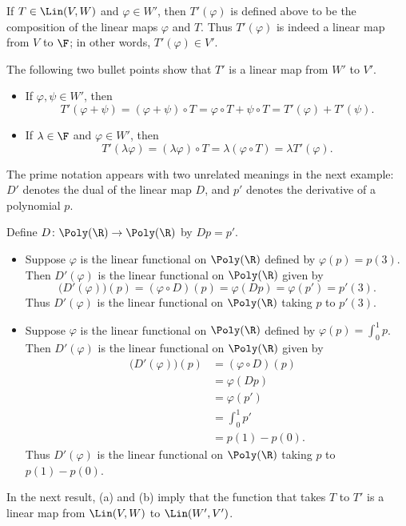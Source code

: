If $T\in\Lin(V,W)$ and $\varphi\in W'$, then $T'(\varphi)$ is defined above to be
the composition of the linear maps $\varphi$ and $T$. Thus $T'(\varphi)$ is
indeed a linear map from $V$ to $\F$; in other words, $T'(\varphi)\in V'$.

The following two bullet points show that $T'$ is a linear map from $W'$ to
$V'$.
\begin{itemize}
\item If $\varphi,\psi\in W'$, then
  \[ T'(\varphi+\psi) = (\varphi+\psi)\circ T = \varphi\circ T+\psi\circ T
     = T'(\varphi)+T'(\psi). \]
\item If $\lambda\in\F$ and $\varphi\in W'$, then
  \[ T'(\lambda\varphi) = (\lambda\varphi)\circ T = \lambda(\varphi\circ T)
     = \lambda T'(\varphi). \]
\end{itemize}

The prime notation appears with two unrelated meanings in the next example: $D'$
denotes the dual of the linear map $D$, and $p'$ denotes the derivative of a
polynomial $p$.

\begin{example}\label{ax:3.119}
Define $D\colon\Poly(\R)\to\Poly(\R)$ by $Dp=p'$.
\begin{itemize}
\item Suppose $\varphi$ is the linear functional on $\Poly(\R)$ defined by
  $\varphi(p)=p(3)$. Then $D'(\varphi)$ is the linear functional on $\Poly(\R)$
  given by
  \[ \bigl(D'(\varphi)\bigr)(p) = (\varphi\circ D)(p) = \varphi(Dp)
     = \varphi(p') = p'(3). \]
  Thus $D'(\varphi)$ is the linear functional on $\Poly(\R)$ taking $p$ to
  $p'(3)$.
\item Suppose $\varphi$ is the linear functional on $\Poly(\R)$ defined by
  $\varphi(p)=\int_0^1p$. Then $D'(\varphi)$ is the linear functional on
  $\Poly(\R)$ given by
  \begin{align*}
  \bigl(D'(\varphi)\bigr)(p) &= (\varphi\circ D)(p)\\
    &= \varphi(Dp)\\
    &= \varphi(p')\\
    &= \int_0^1 p'\\
    &= p(1)-p(0).
  \end{align*}
  Thus $D'(\varphi)$ is the linear functional on $\Poly(\R)$ taking $p$ to
  $p(1)-p(0)$.
\end{itemize}
\end{example}

In the next result, (a) and (b) imply that the function that takes $T$ to $T'$
is a linear map from $\Lin(V,W)$ to $\Lin(W',V')$.

